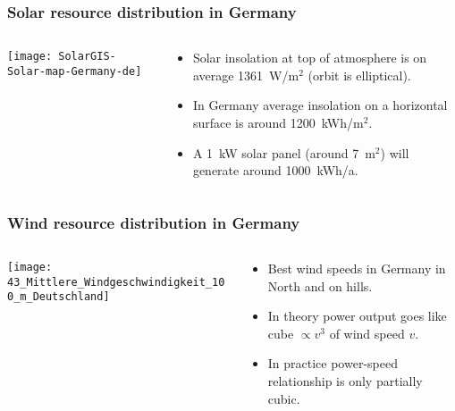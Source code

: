 \documentclass[10pt,aspectratio=169,dvipsnames]{beamer}
\let\olditem\item
\renewcommand{\item}{%
\olditem\vspace{5pt}}
\begin{document}
\begin{frame}
  \frametitle{Solar resource distribution in Germany}


    \begin{columns}[T]
\begin{column}{5.5cm}
  \texttt{[image: SolarGIS-Solar-map-Germany-de]}
\end{column}
\begin{column}{4.5cm}

  \begin{itemize}
    \item Solar insolation at top of atmosphere is on average 1361~W/m${}^2$
  (orbit is elliptical).
    \item In Germany average insolation on a horizontal surface is
      around 1200~kWh/m${}^2$.
    \item A 1~kW solar panel (around 7~m${}^2$) will generate around 1000~kWh/a.
  \end{itemize}
\end{column}
\end{columns}


\end{frame}





\begin{frame}
  \frametitle{Wind resource distribution in Germany}


    \begin{columns}[T]
\begin{column}{8.5cm}
  \texttt{[image: 43\_Mittlere\_Windgeschwindigkeit\_100\_m\_Deutschland]}
\end{column}
\begin{column}{3.5cm}

  \begin{itemize}
  \item Best wind speeds in Germany in North and on hills.
    \item In theory power output goes like cube $\propto v^3$ of wind
      speed $v$.
    \item In practice power-speed relationship is only partially
      cubic.
  \end{itemize}
\end{column}
\end{columns}


\end{frame}
\end{document}
